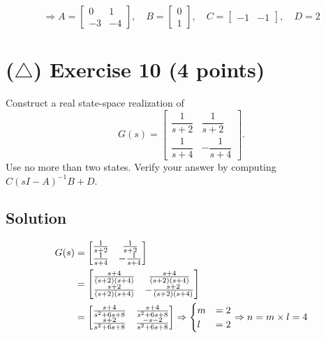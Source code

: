 \documentclass[12pt,a4paper]{article}
\begin{document}
\[
\Rightarrow A = \begin{bmatrix}
	0 & 1 \\ -3 & -4
\end{bmatrix}, \quad B = \begin{bmatrix}
0 \\ 1
\end{bmatrix}, \quad C = \begin{bmatrix}
-1 & -1
\end{bmatrix}, \quad D = 2
\]


\vspace{3cm}
\clearpage
\section*{($\triangle$) Exercise 10 \hfill {\normalsize (4 points)}}
Construct a real state-space realization of
\[
G(s)=\begin{bmatrix}
\dfrac1{s+2}&\dfrac1{s+2}\\[4pt]
\dfrac1{s+4}&-\dfrac1{s+4}
\end{bmatrix}.
\]
Use no more than two states. Verify your answer by computing $C(sI-A)^{-1}B+D$.
\subsection*{Solution}

\begin{align*}
	G(s) &= \begin{bmatrix}
		{1\over s+ 2} & {1\over s+ 2} \\
		{1\over s+4} & -{1\over s+4}
	\end{bmatrix} \\
	&= \begin{bmatrix}
		{s + 4 \over (s +2)(s + 4)} & {s + 4 \over (s +2)(s + 4)}  \\
		{s + 2 \over (s +2)(s + 4)} & -{s + 2 \over (s +2)(s + 4)} 
	\end{bmatrix} \\
	&= \begin{bmatrix}
		{s + 4 \over s^2 + 6s + 8} & {s + 4 \over s^2 + 6s + 8} \\
		{s + 2 \over s^2 + 6s + 8} & {-s - 2 \over s^2 + 6s + 8}
	\end{bmatrix} \Rightarrow \begin{cases}
	m &= 2 \\
	l &= 2 
	\end{cases} \Rightarrow n = m \times l = 4
\end{align*}
\end{document}
